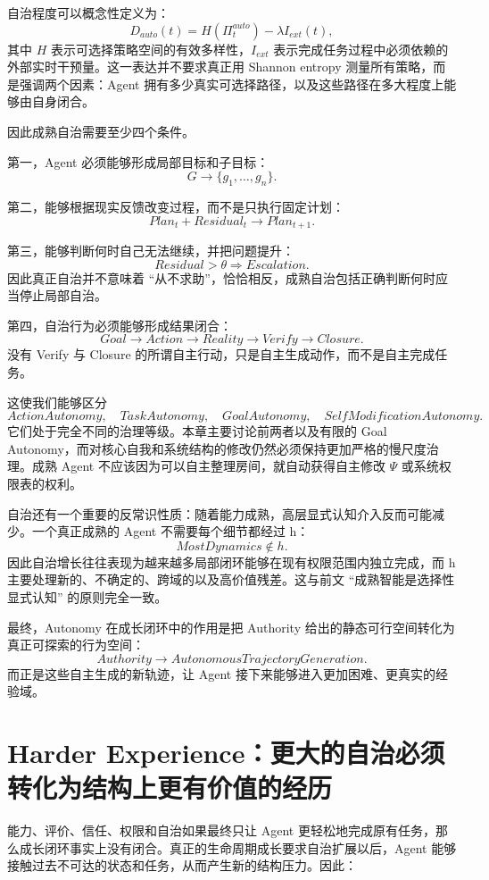 自治程度可以概念性定义为：
\[
D_{auto}(t)
=
H(
\Pi_t^{auto}
)
-
\lambda I_{ext}(t),
\]
其中 $H$ 表示可选择策略空间的有效多样性，$I_{ext}$ 表示完成任务过程中必须依赖的外部实时干预量。这一表达并不要求真正用 Shannon entropy 测量所有策略，而是强调两个因素：Agent 拥有多少真实可选择路径，以及这些路径在多大程度上能够由自身闭合。

因此成熟自治需要至少四个条件。

第一，Agent 必须能够形成局部目标和子目标：
\[
G
\rightarrow
\{g_1,\ldots,g_n\}.
\]

第二，能够根据现实反馈改变过程，而不是只执行固定计划：
\[
Plan_t
+
Residual_t
\rightarrow
Plan_{t+1}.
\]

第三，能够判断何时自己无法继续，并把问题提升：
\[
Residual>\theta
\Rightarrow
Escalation.
\]
因此真正自治并不意味着 ``从不求助''，恰恰相反，成熟自治包括正确判断何时应当停止局部自治。

第四，自治行为必须能够形成结果闭合：
\[
Goal
\rightarrow
Action
\rightarrow
Reality
\rightarrow
Verify
\rightarrow
Closure.
\]
没有 Verify 与 Closure 的所谓自主行动，只是自主生成动作，而不是自主完成任务。

这使我们能够区分
\[
ActionAutonomy,
\quad
TaskAutonomy,
\quad
GoalAutonomy,
\quad
SelfModificationAutonomy.
\]
它们处于完全不同的治理等级。本章主要讨论前两者以及有限的 Goal Autonomy，而对核心自我和系统结构的修改仍然必须保持更加严格的慢尺度治理。成熟 Agent 不应该因为可以自主整理房间，就自动获得自主修改 $\Psi$ 或系统权限表的权利。

自治还有一个重要的反常识性质：随着能力成熟，高层显式认知介入反而可能减少。一个真正成熟的 Agent 不需要每个细节都经过 h：
\[
MostDynamics
\notin h.
\]
因此自治增长往往表现为越来越多局部闭环能够在现有权限范围内独立完成，而 h 主要处理新的、不确定的、跨域的以及高价值残差。这与前文 ``成熟智能是选择性显式认知'' 的原则完全一致。

最终，Autonomy 在成长闭环中的作用是把 Authority 给出的静态可行空间转化为真正可探索的行为空间：
\[
Authority
\rightarrow
AutonomousTrajectoryGeneration.
\]
而正是这些自主生成的新轨迹，让 Agent 接下来能够进入更加困难、更真实的经验域。

\section{Harder Experience：更大的自治必须转化为结构上更有价值的经历}

能力、评价、信任、权限和自治如果最终只让 Agent 更轻松地完成原有任务，那么成长闭环事实上没有闭合。真正的生命周期成长要求自治扩展以后，Agent 能够接触过去不可达的状态和任务，从而产生新的结构压力。因此：
\begin{statementbox}
\centering
{}
\end{statementbox}

